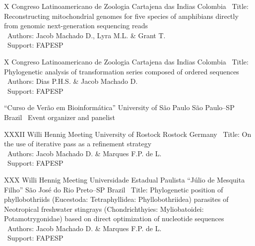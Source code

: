\documentclass[11pt, letterpaper, sans]{moderncv}
\begin{document}
\vspace{.5em}

	{X Congreso Latinoamericano de Zoologia}
	{Cartajena das Indias}
	{Colombia}
	{}
	{
		\textbullet~Title: Reconstructing mitochondrial genomes for five species of amphibians directly from genomic next-generation sequencing reads\\
		\textbullet~Authors: Jacob Machado D., Lyra M.L. \& Grant T.\\
		\textbullet~Support: FAPESP
	}

\vspace{.5em}

\cventry{---}
	{X Congreso Latinoamericano de Zoologia}
	{Cartajena das Indias}
	{Colombia}
	{}
	{
		\textbullet~Title: Phylogenetic analysis of transformation series composed of ordered sequences\\
		\textbullet~Authors: Dias P.H.S. \& Jacob Machado D.\\
		\textbullet~Support: FAPESP
	}

\vspace{.5em}

\cventry{---}
	{``Curso de Verão em Bioinformática''}
	{University of São Paulo}
	{São Paulo--SP}
	{Brazil}
	{
		\textbullet~Event organizer and panelist
	}

\vspace{.5em}

	{XXXII Willi Hennig Meeting}
	{University of Rostock}
	{Rostock}
	{Germany}
	{
		\textbullet~Title: On the use of iterative pass as a refinement strategy\\
		\textbullet~Authors: Jacob Machado D. \& Marques F.P. de L.\\
		\textbullet~Support: FAPESP
	}

\vspace{.5em}

	{XXX Willi Hennig Meeting}
	{Universidade Estadual Paulista ``Júlio de Mesquita Filho''}
	{São José do Rio Preto--SP}
	{Brazil}
	{
		\textbullet~Title: Phylogenetic position of phyllobothriids (Eucestoda: Tetraphyllidea: Phyllobothriidea) parasites of Neotropical freshwater stingrays (Chondrichthyies: Myliobatoidei: Potamotrygonidae) based on direct optimization of nucleotide sequences\\
		\textbullet~Authors: Jacob Machado D. \& Marques F.P. de L.\\
		\textbullet~Support: FAPESP
	}

\vspace{.5em}
\end{document}
